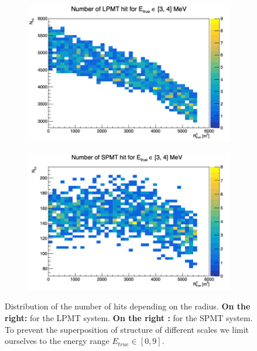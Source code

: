 \documentclass[../main.tex]{subfiles}
\begin{document}
\begin{figure}[ht]
  \centering
  \begin{subfigure}[t]{0.48\linewidth}
    \centering
    \includegraphics[width=\linewidth]{images/jgnn/lpmt_hit_r.png}
    \caption{}
    \label{fig:jgnn:lpmt_hit_r}
  \end{subfigure}
  \hfill
  \begin{subfigure}[t]{0.48\linewidth}
    \centering
    \includegraphics[width=\linewidth]{images/jgnn/spmt_hit_r.png}
    \caption{}
    \label{fig:jgnn:spmt_hit_r}
  \end{subfigure}
  \caption{Distribution of the number of hits depending on the radius. \textbf{On the right:} for the LPMT system. \textbf{On the right :} for the SPMT system. To prevent the superposition of structure of different scales we limit ourselves to the energy range $E_{true} \in [0, 9]$.}
\end{figure}
\end{document}
